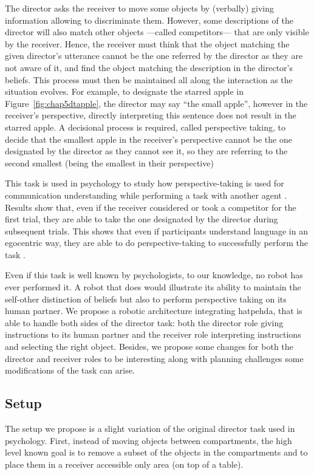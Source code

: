 \documentclass[a4paper,11pt,twoside]{StyleThese}
\begin{document}
The director asks the receiver to move some objects by (verbally) giving information allowing to discriminate them. However, some descriptions of the director will also match other objects ---called competitors--- that are only visible by the receiver. Hence, the receiver must think that the object matching the given director's utterance cannot be the one referred by the director as they are not aware of it, and find the object matching the description in the director's beliefs. This process must then be maintained all along the interaction as the situation evolves. For example, to designate the starred apple in Figure~\ref{fig:chap5dtapple}, the director may say ``the small apple'', however in the receiver's perspective, directly interpreting this sentence does not result in the starred apple. A decisional process is required, called perspective taking, to decide that the smallest apple in the receiver's perspective cannot be the one designated by the director as they cannot see it, so they are referring to the second smallest (being the smallest in their perspective)

\medskip

This task is used in psychology to study how perspective-taking is used for communication understanding while performing a task with another agent \cite{keysar2000taking}. Results show that, even if the receiver considered or took a competitor for the first trial, they are able to take the one designated by the director during subsequent trials. This shows that even if participants understand language in an egocentric way, they are able to do perspective-taking to successfully perform the task \cite{keysar2003limits}. 

Even if this task is well known by psychologists, to our knowledge, no robot has ever performed it. A robot that does would illustrate its ability to maintain the self-other distinction of beliefs but also to perform perspective taking on its human partner. We propose a robotic architecture integrating \acrshort{hatpehda}, that is able to handle both sides of the director task: both the director role giving instructions to its human partner and the receiver role interpreting instructions and selecting the right object. Besides, we propose some changes for both the director and receiver roles to be interesting along with planning challenges some modifications of the task can arise.

\subsection{Setup}
The setup we propose is a slight variation of the original director task used in psychology. First, instead of moving objects between compartments, the high level known goal is to remove a subset of the objects in the compartments and to place them in a receiver accessible only area (on top of a table). 
\end{document}

